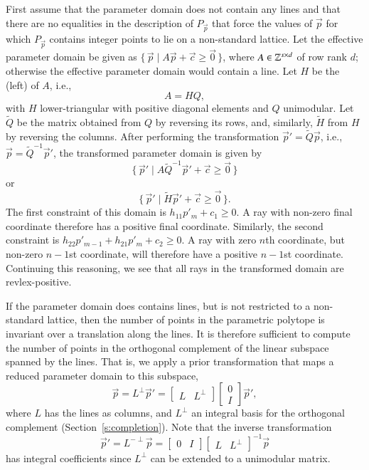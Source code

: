 First assume that the parameter domain does not contain any lines and
that there are no equalities in the description of $P_{\vec p}$ that force
the values of $\vec p$ for which $P_{\vec p}$ contains integer points
to lie on a non-standard lattice.
Let the effective parameter domain be given as
$
\{\, \vec p \mid A \vec p + \vec c \ge \vec 0 \,\}
$,
where $A \in \mathbb{Z}^{s \times d}$ of row rank $d$;
otherwise the effective parameter domain would contain a line.
Let $H$ be the (left)  of $A$, i.e.,
$$
A = H Q
,
$$
with $H$ lower-triangular with positive diagonal elements and
$Q$ unimodular.
Let $\tilde Q$ be the matrix obtained from $Q$ by reversing its rows,
and, similarly, $\tilde H$ from $H$ by reversing the columns.
After performing the transformation
$\vec p' = \tilde Q \vec p$, i.e.,
$\vec p = \tilde Q^{-1} \vec p'$, the transformed parameter domain
is given by
$$
\{\, \vec p' \mid A \tilde Q^{-1} \vec p' + \vec c \ge \vec 0 \,\}
$$
or
$$
\{\, \vec p' \mid \tilde H \vec p' + \vec c \ge \vec 0 \,\}
.
$$
The first constraint of this domain is
$h_{11} p'_m + c_1 \ge 0$.  A ray with non-zero final coordinate
therefore has a positive final coordinate.
Similarly, the second constraint is
$h_{22} p'_{m-1} + h_{21} p'_m + c_2 \ge 0$.
A ray with zero $n$th coordinate, but non-zero $n-1$st coordinate,
will therefore have a positive $n-1$st coordinate.
Continuing this reasoning, we see that all rays in the transformed
domain are revlex-positive.

If the parameter domain does contains lines, but is not restricted
to a non-standard lattice, then the number of points in the parametric
polytope is invariant over a translation along the lines.
It is therefore sufficient to compute the number of points in the
orthogonal complement of the linear subspace spanned by the lines.
That is, we apply a prior transformation that maps a reduced parameter
domain to this subspace,
$$
\vec p = L^\perp \vec p' =
\begin{bmatrix}
L & L^\perp
\end{bmatrix}
\begin{bmatrix}
0 \\ I
\end{bmatrix}
\vec p'
,
$$
where $L$ has the lines as columns, and $L^\perp$ an integral basis
for the orthogonal complement (Section~\ref{s:completion}).
Note that the inverse transformation
$$
\vec p' =
L^{-\perp}
\vec p =
\begin{bmatrix}
0 & I
\end{bmatrix}
\begin{bmatrix}
L & L^\perp
\end{bmatrix}^{-1}
\vec p
$$
has integral coefficients since $L^\perp$ can be extended to a unimodular matrix.

